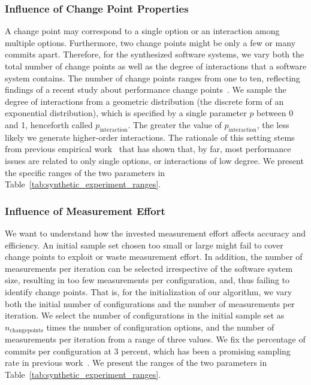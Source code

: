 \documentclass[sigconf]{acmart}
\begin{document}
	\subsubsection{Influence of Change Point Properties}
	A change point may correspond to a single option or an interaction among multiple options. Furthermore, two change points might be only a few or many commits apart. Therefore, for the synthesized software systems, we vary both the total number of change points as well as the degree of interactions that a software system contains. The number of change points ranges from one to ten, reflecting findings of a recent study about performance change points~\cite{muhlbauer_accurate_2019}. We sample the degree of interactions from a geometric distribution (the discrete form of an exponential distribution), which is specified by a single parameter $p$ between 0 and 1, henceforth called $p_\text{interaction}$. The greater the value of $p_\text{interaction}$, the less likely we generate higher-order interactions. The rationale of this setting stems from previous empirical work~\cite{medeiros_comparison_2016,kolesnikov_tradeoffs_2019} that has shown that, by far, most performance issues are related to only single options, or interactions of low degree. We present the specific ranges of the two parameters in Table~\ref{tab:synthetic_experiment_ranges}.
	
	\subsubsection{Influence of Measurement Effort}
	We want to understand how the invested measurement effort affects accuracy and efficiency. An initial sample set chosen too small or large might fail to cover change points to exploit or waste measurement effort. In addition, the number of measurements per iteration can be selected irrespective of the software system size, resulting in too few measurements per configuration, and, thus failing to identify change points. That is, for the initialization of our algorithm, we vary both the initial number of configurations and the number of measurements per iteration. We select the number of configurations in the initial sample set as $n_\text{changepoints}$ times the number of configuration options, and the number of measurements per iteration from a range of three values. We fix the percentage of commits per configuration at 3 percent, which has been a promising sampling rate in previous work~\cite{muhlbauer_accurate_2019}. 
	We present the ranges of the two parameters in Table~\ref{tab:synthetic_experiment_ranges}.
	
\end{document}
